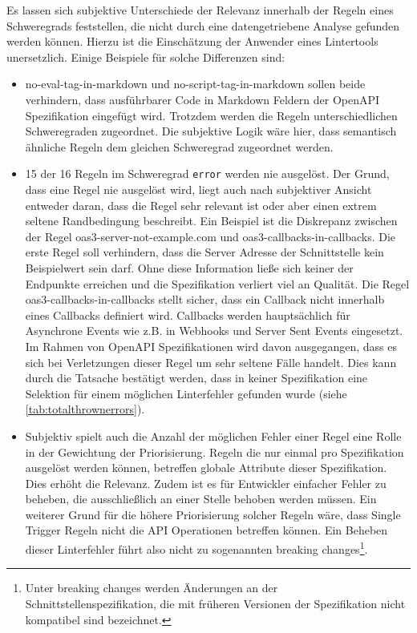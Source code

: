 Es lassen sich subjektive Unterschiede der Relevanz innerhalb der Regeln eines Schweregrads feststellen, die nicht durch eine datengetriebene Analyse gefunden werden können. Hierzu ist die Einschätzung der Anwender eines Lintertools unersetzlich. Einige Beispiele für solche Differenzen sind:
\begin{itemize}
  \item no-eval-tag-in-markdown und no-script-tag-in-markdown sollen beide verhindern, dass ausführbarer Code in Markdown Feldern der OpenAPI Spezifikation eingefügt wird. Trotzdem werden die Regeln unterschiedlichen Schweregraden zugeordnet. Die subjektive Logik wäre hier, dass semantisch ähnliche Regeln dem gleichen Schweregrad zugeordnet werden.
  \item 15 der 16 Regeln im Schweregrad \texttt{error} werden nie ausgelöst. Der Grund, dass eine Regel nie ausgelöst wird, liegt auch nach subjektiver Ansicht entweder daran, dass die Regel sehr relevant ist oder aber einen extrem seltene Randbedingung beschreibt. Ein Beispiel ist die Diskrepanz zwischen der Regel oas3-server-not-example.com und oas3-callbacks-in-callbacks. Die erste Regel soll verhindern, dass die Server Adresse der Schnittstelle kein Beispielwert sein darf. Ohne diese Information ließe sich keiner der Endpunkte erreichen und die Spezifikation verliert viel an Qualität. Die Regel oas3-callbacks-in-callbacks stellt sicher, dass ein Callback nicht innerhalb eines Callbacks definiert wird. Callbacks werden hauptsächlich für Asynchrone Events wie z.B. in Webhooks und Server Sent Events eingesetzt. Im Rahmen von OpenAPI Spezifikationen wird davon ausgegangen, dass es sich bei Verletzungen dieser Regel um sehr seltene Fälle handelt. Dies kann durch die Tatsache bestätigt werden, dass in keiner Spezifikation eine Selektion für einem möglichen Linterfehler gefunden wurde (siehe \ref{tab:totalthrownerrors}).
  \item Subjektiv spielt auch die Anzahl der möglichen Fehler einer Regel eine Rolle in der Gewichtung der Priorisierung. Regeln die nur einmal pro Spezifikation ausgelöst werden können, betreffen globale Attribute dieser Spezifikation. Dies erhöht die Relevanz. Zudem ist es für Entwickler einfacher Fehler zu beheben, die ausschließlich an einer Stelle behoben werden müssen. Ein weiterer Grund für die höhere Priorisierung solcher Regeln wäre, dass Single Trigger Regeln nicht die API Operationen betreffen können. Ein Beheben dieser Linterfehler führt also nicht zu sogenannten breaking changes\footnote{Unter breaking changes werden Änderungen an der Schnittstellenspezifikation, die mit früheren Versionen der Spezifikation nicht kompatibel sind bezeichnet.}. 
\end{itemize}

